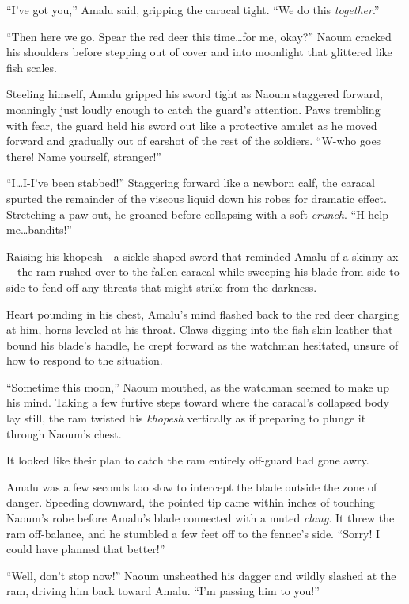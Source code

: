 ``I've got you,'' Amalu said, gripping the caracal tight. ``We do this \emph{together}.''

``Then here we go. Spear the red deer this time\ldots{}for me, okay?'' Naoum cracked his shoulders before stepping out of cover and into moonlight that glittered like fish scales.

Steeling himself, Amalu gripped his sword tight as Naoum staggered forward, moaningly just loudly enough to catch the guard's attention. Paws trembling with fear, the guard held his sword out like a protective amulet as he moved forward and gradually out of earshot of the rest of the soldiers. ``W-who goes there! Name yourself, stranger!''

``I\ldots{}I-I've been stabbed!'' Staggering forward like a newborn calf, the caracal spurted the remainder of the viscous liquid down his robes for dramatic effect. Stretching a paw out, he groaned before collapsing with a soft \emph{crunch}. ``H-help me\ldots{}bandits!''

Raising his khopesh---a sickle-shaped sword that reminded Amalu of a skinny ax---the ram rushed over to the fallen caracal while sweeping his blade from side-to-side to fend off any threats that might strike from the darkness.

Heart pounding in his chest, Amalu's mind flashed back to the red deer charging at him, horns leveled at his throat. Claws digging into the fish skin leather that bound his blade's handle, he crept forward as the watchman hesitated, unsure of how to respond to the situation.

``Sometime this moon,'' Naoum mouthed, as the watchman seemed to make up his mind. Taking a few furtive steps toward where the caracal's collapsed body lay still, the ram twisted his \emph{khopesh} vertically as if preparing to plunge it through Naoum's chest.

It looked like their plan to catch the ram entirely off-guard had gone awry.

Amalu was a few seconds too slow to intercept the blade outside the zone of danger. Speeding downward, the pointed tip came within inches of touching Naoum's robe before Amalu's blade connected with a muted \emph{clang}. It threw the ram off-balance, and he stumbled a few feet off to the fennec's side. ``Sorry! I could have planned that better!''

``Well, don't stop now!'' Naoum unsheathed his dagger and wildly slashed at the ram, driving him back toward Amalu. ``I'm passing him to you!''

